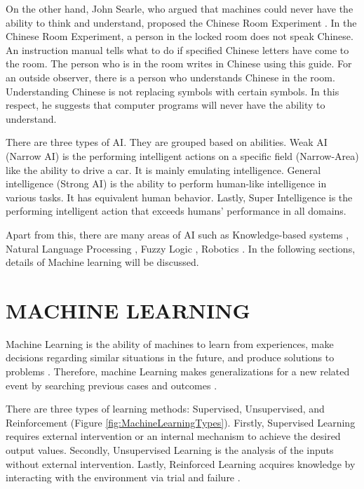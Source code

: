 On the other hand, John Searle, who argued that machines could never have the ability to think and understand, proposed the Chinese Room Experiment \cite{preston2002views}. In the Chinese Room Experiment, a person in the locked room does not speak Chinese. An instruction manual tells what to do if specified Chinese letters have come to the room. The person who is in the room writes in Chinese using this guide. For an outside observer, there is a person who understands Chinese in the room. Understanding Chinese is not replacing symbols with certain symbols. In this respect, he suggests that computer programs will never have the ability to understand.

There are three types of AI. They are grouped based on abilities. Weak AI (Narrow AI) \cite{confbringsjord2003artificial} is the performing intelligent actions on a specific field (Narrow-Area) like the ability to drive a car. It is mainly emulating intelligence. General intelligence (Strong AI) \cite{confbringsjord2003artificial} is the ability to perform human-like intelligence in various tasks. It has equivalent human behavior. Lastly, Super Intelligence is the performing intelligent action that exceeds humans' performance in all domains.

Apart from this, there are many areas of AI such as Knowledge-based systems \cite{davis1982knowledge}, Natural Language Processing \cite{dale2000handbook}, Fuzzy Logic \cite{zadeh1996fuzzy}, Robotics \cite{brady1984artificial}. In the following sections, details of Machine learning will be discussed.

\section{MACHINE LEARNING}
Machine Learning is the ability of machines to learn from experiences, make decisions regarding similar situations in the future, and produce solutions to problems \cite{booksmichie1994machine}. Therefore, machine Learning makes generalizations for a new related event by searching previous cases and outcomes \cite{booksmichie1994machine}.

There are three types of learning methods: Supervised, Unsupervised, and Reinforcement (Figure \ref{fig:MachineLearningTypes}). Firstly, Supervised Learning requires external intervention or an internal mechanism to achieve the desired output values. Secondly, Unsupervised Learning is the analysis of the inputs without external intervention. Lastly, Reinforced Learning acquires knowledge by interacting with the environment via trial and failure \cite{sathya2013comparison}.

